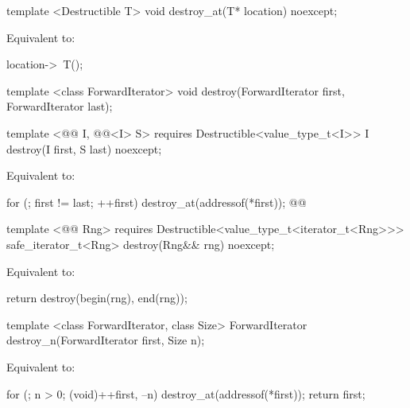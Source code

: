 {\color{addclr}
\begin{codeblock}
template <Destructible T>
void destroy_at(T* location) noexcept;
\end{codeblock}
} %

\setcounter{Paras}{0}
\pnum
\effects Equivalent to:
\begin{codeblock}
    location->~T();
\end{codeblock}

{\color{remclr}
\begin{codeblock}
template <class ForwardIterator>
  void destroy(ForwardIterator first, ForwardIterator last);
\end{codeblock}
} %

{\color{addclr}
\begin{codeblock}
template <@@ I, @@<I> S>
requires
  Destructible<value_type_t<I>>
I destroy(I first, S last) noexcept;
\end{codeblock}
} %

\pnum
\effects Equivalent to:
\begin{codeblock}
    for (; first != last; ++first)
      destroy_at(addressof(*first));
    @@
\end{codeblock}


{\color{addclr}
\begin{codeblock}
template <@@ Rng>
requires
  Destructible<value_type_t<iterator_t<Rng>>>
safe_iterator_t<Rng> destroy(Rng&& rng) noexcept;
\end{codeblock}

\pnum
\effects Equivalent to:
\begin{codeblock}
    return destroy(begin(rng), end(rng));
\end{codeblock}
} %

{\color{remclr}
\begin{codeblock}
template <class ForwardIterator, class Size>
  ForwardIterator destroy_n(ForwardIterator first, Size n);
\end{codeblock}

\setcounter{Paras}{2}
\pnum
\effects Equivalent to:
\begin{codeblock}
      for (; n > 0; (void)++first, --n)
          destroy_at(addressof(*first));
        return first;
\end{codeblock}
} %

